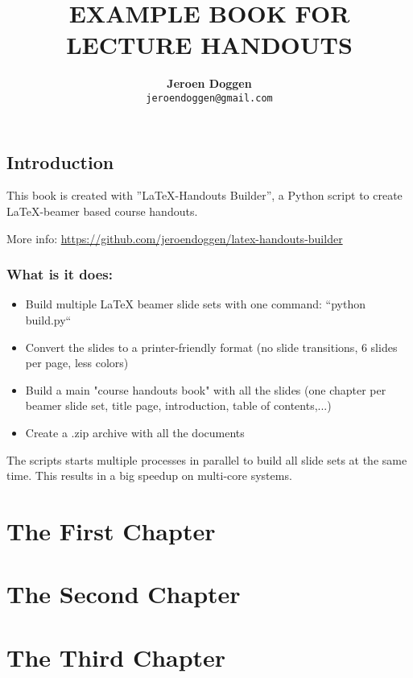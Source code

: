 \documentclass{book}
\title{\LARGE \textbf{\uppercase{ Example Book for Lecture  Handouts}}}
\author{\textbf{Jeroen Doggen}  \\
        \texttt{jeroendoggen@gmail.com}
}
\begin{document}
\maketitle
\tableofcontents

\chapter*{Introduction}
\label{chap_intro}

This book is created with ''\LaTeX -Handouts Builder'', a Python script to create \LaTeX-beamer based course handouts.

\noindent More info: \url{https://github.com/jeroendoggen/latex-handouts-builder}


\section*{What is it does:}

\begin{itemize}
\item Build multiple LaTeX beamer slide sets with one command: ``python build.py``
\item Convert the slides to a printer-friendly format (no slide transitions, 6 slides per page, less colors)
\item Build a main "course handouts book" with all the slides (one chapter per beamer slide set, title page, introduction, table of contents,...)
\item Create a .zip archive with all the documents
\end{itemize}

\noindent The scripts starts multiple processes in parallel to build all slide sets at the same time. This results in a big speedup on multi-core systems.

\part{The First Chapter}


\part{The Second Chapter}


\part{The Third Chapter}

\end{document}
